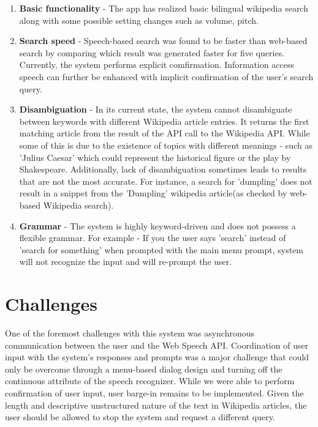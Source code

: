 \documentclass[11pt,a4paper]{article}
\begin{document}
\begin{enumerate}
\item \textbf{Basic functionality} - The app has realized basic bilingual wikipedia search along with some possible setting changes such as volume, pitch. 

\item \textbf{Search speed} - Speech-based search was found to be faster than web-based search by comparing which result was generated faster for five queries. Currently, the system performs explicit comfirmation. Information access speech can further be enhanced with implicit confirmation of the user's search query.

\item \textbf{Disambiguation} - 
In its current state, the system cannot disambiguate between keywords with different Wikipedia article entries. It returns the first matching article from the result of the API call to the Wikipedia API. While some of this is due to the existence of topics with different meanings - such as 'Julius Caesar' which could represent the historical figure or the play by Shakespeare. Additionally, lack of disambiguation sometimes leads to results that are not the most accurate. For instance, a search for 'dumpling' does not result in a snippet from the 'Dumpling' wikipedia article(as checked by web-based Wikipedia search).

\item \textbf{Grammar} - The system is highly keyword-driven and does not possess a flexible grammar. For example - If you the user says 'search' instead of 'search for something' when prompted with the main menu prompt, system will not recognize the input and will re-prompt the user. 

\end{enumerate}


\section{Challenges}
One of the foremost challenges with this system was asynchronous communication between the user and the Web Speech API. Coordination of user input with the system's responses and prompts was a major challenge that could only be overcome through a menu-based dialog design and turning off the continuous attribute of the speech recognizer. While we were able to perform confirmation of user input, user barge-in remains to be implemented. Given the length and descriptive unstructured nature of the text in Wikipedia articles, the user should be allowed to stop the system and request a different query. 
\end{document}
